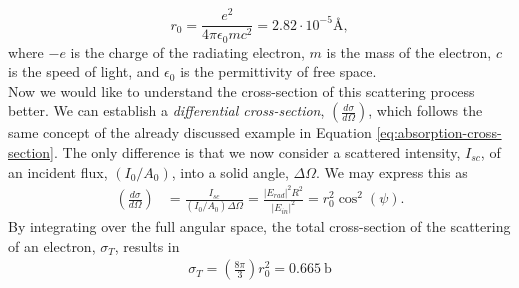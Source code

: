 \begin{equation}
r_0 = \frac{e^2}{4\pi \epsilon_0 m c^2} = 2.82\cdot 10^{-5}\si{\angstrom},
\label{eq:thomson-scattering-length}
\end{equation}
where $-e$ is the charge of the radiating electron, $m$ is the mass of the electron, $c$ is the speed of light, and $\epsilon_0$ is the permittivity of free space.\\[1\baselineskip]
%
Now we would like to understand the cross-section of this scattering process better. We can establish a \textit{differential cross-section}, $\left(\tfrac{d\sigma}{d\Omega}\right)$, which follows the same concept of the already discussed example in Equation \eqref{eq:absorption-cross-section}. The only difference is that we now consider a scattered intensity, $I_{sc}$, of an incident flux, $\left(I_{0}/A_{0}\right)$, into a solid angle, $\Delta \Omega$. We may express this as
\begin{align}
\left(\frac{d\sigma}{d\Omega}\right)&=\frac{I_{sc}}{\left(I_{0}/A_{0}\right)\Delta\Omega}=\frac{\lvert E_{rad}\rvert^2 R^2}{\lvert E_{in}\rvert^2}=r_0^2 \cos^{2}\left(\psi\right).
\label{eq:scattering-crosssection}
\end{align}
By integrating over the full angular space, the total cross-section of the scattering of an electron, $\sigma_{T}$, results in
\begin{align}
\sigma_{T} = \left(\frac{8\pi}{3}\right) r_{0}^{2} = \SI{0.665}{\barn}
\label{eq:Thomson-cross-section}
\end{align}

